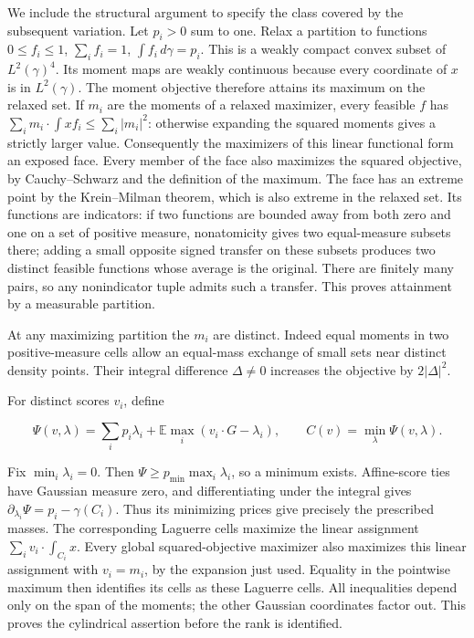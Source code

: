 \documentclass[
  11pt,
]{article}
\begin{document}
We include the structural argument to specify the class covered by the
subsequent variation. Let \(p_i>0\) sum to one. Relax a partition to
functions \(0\le f_i\le1\), \(\sum_i f_i=1\), \(\int f_i\,d\gamma=p_i\).
This is a weakly compact convex subset of \(L^2(\gamma)^4\). Its moment
maps are weakly continuous because every coordinate of \(x\) is in
\(L^2(\gamma)\). The moment objective therefore attains its maximum on
the relaxed set. If \(m_i\) are the moments of a relaxed maximizer,
every feasible \(f\) has \(\sum_i m_i\cdot\int xf_i\le\sum_i|m_i|^2\):
otherwise expanding the squared moments gives a strictly larger value.
Consequently the maximizers of this linear functional form an exposed
face. Every member of the face also maximizes the squared objective, by
Cauchy--Schwarz and the definition of the maximum. The face has an
extreme point by the Krein--Milman theorem, which is also extreme in the
relaxed set. Its functions are indicators: if two functions are bounded
away from both zero and one on a set of positive measure, nonatomicity
gives two equal-measure subsets there; adding a small opposite signed
transfer on these subsets produces two distinct feasible functions whose
average is the original. There are finitely many pairs, so any
nonindicator tuple admits such a transfer. This proves attainment by a
measurable partition.

At any maximizing partition the \(m_i\) are distinct. Indeed equal
moments in two positive-measure cells allow an equal-mass exchange of
small sets near distinct density points. Their integral difference
\(\Delta\ne0\) increases the objective by \(2|\Delta|^2\).

For distinct scores \(v_i\), define

\[
 \Psi(v,\lambda)=\sum_i p_i\lambda_i+
    \mathbb E\max_i(v_i\cdot G-\lambda_i),\qquad
 C(v)=\min_\lambda\Psi(v,\lambda).                        \tag{4}
\]

Fix \(\min_i\lambda_i=0\). Then \(\Psi\ge p_{\min}\max_i\lambda_i\), so
a minimum exists. Affine-score ties have Gaussian measure zero, and
differentiating under the integral gives
\(\partial_{\lambda_i}\Psi=p_i-\gamma(C_i)\). Thus its minimizing prices
give precisely the prescribed masses. The corresponding Laguerre cells
maximize the linear assignment \(\sum_i v_i\cdot\int_{C_i}x\). Every
global squared-objective maximizer also maximizes this linear assignment
with \(v_i=m_i\), by the expansion just used. Equality in the pointwise
maximum then identifies its cells as these Laguerre cells. All
inequalities depend only on the span of the moments; the other Gaussian
coordinates factor out. This proves the cylindrical assertion before the
rank is identified.
\end{document}
